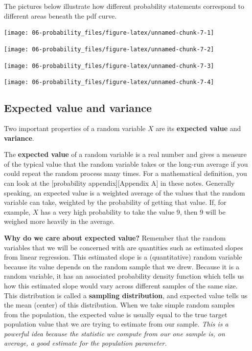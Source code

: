 \documentclass[
]{book}
\begin{document}
The pictures below illustrate how different probability statements correspond to different areas beneath the pdf curve.

\begin{center}\texttt{[image: 06-probability\_files/figure-latex/unnamed-chunk-7-1]} \end{center}

\begin{center}\texttt{[image: 06-probability\_files/figure-latex/unnamed-chunk-7-2]} \end{center}

\begin{center}\texttt{[image: 06-probability\_files/figure-latex/unnamed-chunk-7-3]} \end{center}

\begin{center}\texttt{[image: 06-probability\_files/figure-latex/unnamed-chunk-7-4]} \end{center}

\subsection{Expected value and variance}\label{expected-value-and-variance}

Two important properties of a random variable \(X\) are its \textbf{expected value} and \textbf{variance}.

The \textbf{expected value} of a random variable is a real number and gives a measure of the typical value that the random variable takes or the long-run average if you could repeat the random process many times. For a mathematical definition, you can look at the {[}probability appendix{]}{[}Appendix A{]} in these notes. Generally speaking, an expected value is a weighted average of the values that the random variable can take, weighted by the probability of getting that value. If, for example, \(X\) has a very high probability to take the value 9, then 9 will be weighed more heavily in the average.

\textbf{Why do we care about expected value?} Remember that the random variables that we will be concerned with are quantities such as estimated slopes from linear regression. This estimated slope is a (quantitative) random variable because its value depends on the random sample that we drew. Because it is a random variable, it has an associated probability density function which tells us how this estimated slope would vary across different samples of the same size. This distribution is called a \textbf{sampling distribution}, and expected value tells us the mean (center) of this distribution. When we take simple random samples from the population, the expected value is usually equal to the true target population value that we are trying to estimate from our sample. \emph{This is a powerful idea because the statistic we compute from our one sample is, on average, a good estimate for the population parameter.}
\end{document}
